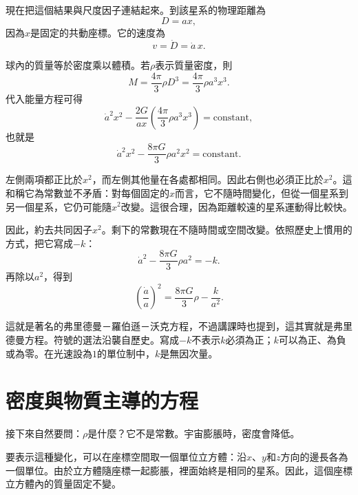 現在把這個結果與尺度因子連結起來。到該星系的物理距離為
\begin{equation}
D=ax,
\end{equation}
因為\(x\)是固定的共動座標。它的速度為
\begin{equation}
v=\dot D=\dot a\,x.
\end{equation}

球內的質量等於密度乘以體積。若\(\rho\)表示質量密度，則
\begin{equation}
M=\frac{4\pi}{3}\rho D^3=\frac{4\pi}{3}\rho a^3x^3.
\end{equation}
代入能量方程可得
\begin{equation}
\dot a^2x^2-\frac{2G}{ax}\left(\frac{4\pi}{3}\rho a^3x^3\right)=\text{constant},
\end{equation}
也就是
\begin{equation}
\dot a^2x^2-\frac{8\pi G}{3}\rho a^2x^2=\text{constant}.
\end{equation}

左側兩項都正比於\(x^2\)，而左側其他量在各處都相同。因此右側也必須正比於\(x^2\)。這和稱它為常數並不矛盾：對每個固定的\(x\)而言，它不隨時間變化，但從一個星系到另一個星系，它仍可能隨\(x^2\)改變。這很合理，因為距離較遠的星系運動得比較快。

因此，約去共同因子\(x^2\)。剩下的常數現在不隨時間或空間改變。依照歷史上慣用的方式，把它寫成\(-k\)：
\begin{equation}
\dot a^2-\frac{8\pi G}{3}\rho a^2=-k.
\end{equation}
再除以\(a^2\)，得到
\begin{equation}
\left(\frac{\dot a}{a}\right)^2=\frac{8\pi G}{3}\rho-\frac{k}{a^2}.
\end{equation}

這就是著名的弗里德曼－羅伯遜－沃克方程，不過講課時也提到，這其實就是弗里德曼方程。符號的選法沿襲自歷史。寫成\(-k\)不表示\(k\)必須為正；\(k\)可以為正、為負或為零。在光速設為\(1\)的單位制中，\(k\)是無因次量。

\section{密度與物質主導的方程}

接下來自然要問：\(\rho\)是什麼？它不是常數。宇宙膨脹時，密度會降低。

要表示這種變化，可以在座標空間取一個單位立方體：沿\(x\)、\(y\)和\(z\)方向的邊長各為一個單位。由於立方體隨座標一起膨脹，裡面始終是相同的星系。因此，這個座標立方體內的質量固定不變。

